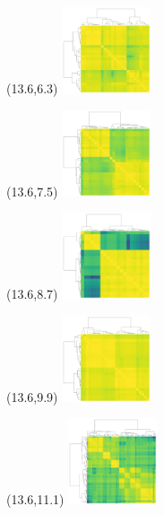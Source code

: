 \documentclass{article}
\begin{document}
\begin{textblock}{1}(13.6,6.3)    \includegraphics[height=1in]{main-figure-assets/clustermaps/chr12.pdf}                          \end{textblock}
\begin{textblock}{1}(13.6,7.5)    \includegraphics[height=1in]{main-figure-assets/clustermaps/14qtel_1-500K_1_12_12_rc.pdf}       \end{textblock}
\begin{textblock}{1}(13.6,8.7)    \includegraphics[height=1in]{main-figure-assets/clustermaps/chr15.pdf}                          \end{textblock}
\begin{textblock}{1}(13.6,9.9)    \includegraphics[height=1in]{main-figure-assets/clustermaps/18qtel_1-500K_1_12_12_rc.pdf}       \end{textblock}
\begin{textblock}{1}(13.6,11.1)   \includegraphics[height=1in]{main-figure-assets/clustermaps/chr21.pdf}                          \end{textblock}
\end{document}
